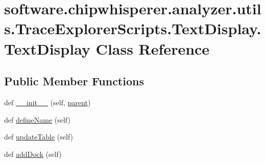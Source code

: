 \hypertarget{classsoftware_1_1chipwhisperer_1_1analyzer_1_1utils_1_1TraceExplorerScripts_1_1TextDisplay_1_1TextDisplay}{}\section{software.\+chipwhisperer.\+analyzer.\+utils.\+Trace\+Explorer\+Scripts.\+Text\+Display.\+Text\+Display Class Reference}
\label{classsoftware_1_1chipwhisperer_1_1analyzer_1_1utils_1_1TraceExplorerScripts_1_1TextDisplay_1_1TextDisplay}
\subsection*{Public Member Functions}
\begin{DoxyCompactItemize}
\item 
def \hyperlink{classsoftware_1_1chipwhisperer_1_1analyzer_1_1utils_1_1TraceExplorerScripts_1_1TextDisplay_1_1TextDisplay_a66a6da7b458670e2faa9656079e9cda4}{\+\_\+\+\_\+init\+\_\+\+\_\+} (self, \hyperlink{classsoftware_1_1chipwhisperer_1_1analyzer_1_1utils_1_1TraceExplorerScripts_1_1TextDisplay_1_1TextDisplay_a3f9f06adb837b2fb65658332889f7627}{parent})
\item 
def \hyperlink{classsoftware_1_1chipwhisperer_1_1analyzer_1_1utils_1_1TraceExplorerScripts_1_1TextDisplay_1_1TextDisplay_a29805f7b9274aadf165b64ba1379d141}{define\+Name} (self)
\item 
def \hyperlink{classsoftware_1_1chipwhisperer_1_1analyzer_1_1utils_1_1TraceExplorerScripts_1_1TextDisplay_1_1TextDisplay_ad115fe634ef23d41473dce2db1401087}{update\+Table} (self)
\item 
def \hyperlink{classsoftware_1_1chipwhisperer_1_1analyzer_1_1utils_1_1TraceExplorerScripts_1_1TextDisplay_1_1TextDisplay_aa6c33f337d3d35b9672e0e7928a6696c}{add\+Dock} (self)
\end{DoxyCompactItemize}
